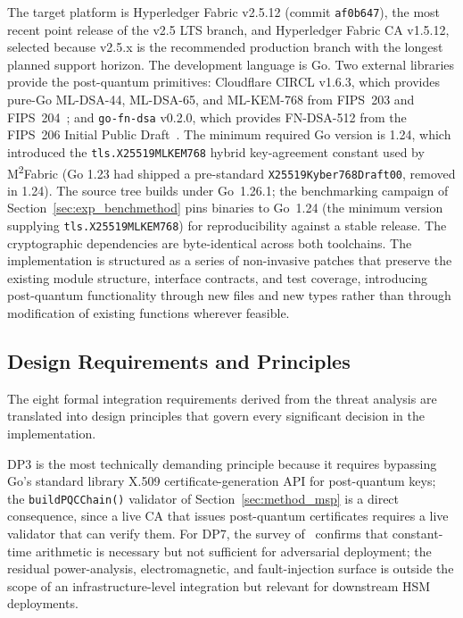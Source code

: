 \documentclass{ieeetj}
\newcommand{\mfabric}{M\textsuperscript{2}Fabric}
\begin{document}
The target platform is Hyperledger Fabric v2.5.12 (commit \texttt{af0b647}),
the most recent point release of the v2.5 LTS branch, and Hyperledger Fabric CA
v1.5.12, selected because v2.5.x is the recommended production branch with the
longest planned support horizon. The development language is Go. Two external
libraries provide the post-quantum primitives: Cloudflare CIRCL v1.6.3, which
provides pure-Go ML-DSA-44, ML-DSA-65, and ML-KEM-768 from FIPS~203 and
FIPS~204~\cite{nist_fips203, nist_fips204}; and \texttt{go-fn-dsa} v0.2.0, which
provides FN-DSA-512 from the FIPS~206 Initial Public Draft~\cite{nist_fips206}.
The minimum required Go version is 1.24, which introduced the
\texttt{tls.X25519MLKEM768} hybrid key-agreement constant used by \mfabric{}
(Go 1.23 had shipped a pre-standard \texttt{X25519Kyber768Draft00}, removed in
1.24). The source tree builds under Go~1.26.1; the benchmarking campaign of
Section~\ref{sec:exp_benchmethod} pins binaries to Go~1.24 (the minimum version
supplying \texttt{tls.X25519MLKEM768}) for reproducibility against a stable
release. The cryptographic dependencies are byte-identical across both
toolchains. The implementation is structured as a series of non-invasive patches
that preserve the existing module structure, interface contracts, and test
coverage, introducing post-quantum functionality through new files and new types
rather than through modification of existing functions wherever feasible.

\subsection{Design Requirements and Principles}
\label{sec:method_principles}

The eight formal integration requirements derived from the threat analysis are
translated into design principles that govern every significant decision in the
implementation. 

DP3 is the most technically demanding principle because it requires bypassing
Go's standard library X.509 certificate-generation API for post-quantum keys;
the \texttt{buildPQCChain()} validator of Section~\ref{sec:method_msp} is a
direct consequence, since a live CA that issues post-quantum certificates
requires a live validator that can verify them. For DP7, the survey
of~\cite{ravi2024sidechannel} confirms that constant-time arithmetic is necessary
but not sufficient for adversarial deployment; the residual power-analysis,
electromagnetic, and fault-injection surface is outside the scope of an
infrastructure-level integration but relevant for downstream HSM deployments.
\end{document}
